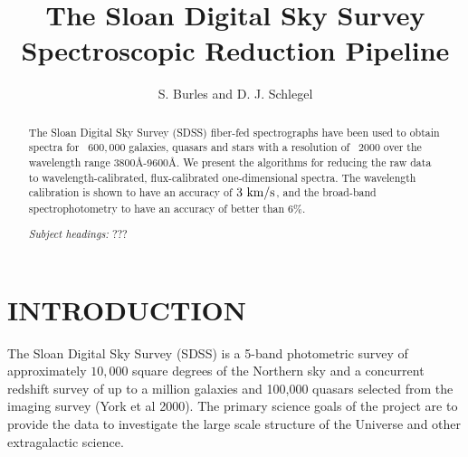 \documentclass[12pt,preprint]{aastex}
\newcommand{\kms}{{\rm ~km/s}}
\begin{document}
\title{The Sloan Digital Sky Survey Spectroscopic Reduction Pipeline}

\author{
S. Burles\altaffilmark{\ref{MIT}}
and D. J. Schlegel\altaffilmark{\ref{Princeton}}
}


\begin{abstract}
The Sloan Digital Sky Survey (SDSS) fiber-fed spectrographs have been used
to obtain spectra for ~$600,000$ galaxies, quasars and stars
with a resolution of ~2000 over the wavelength range 3800\AA -9600\AA.
We present the algorithms for reducing the raw data to
wavelength-calibrated, flux-calibrated one-dimensional spectra.
The wavelength calibration is shown to have an accuracy of $3 \kms$,
and the broad-band spectrophotometry to have an accuracy of better than $6\%$.

\emph{Subject headings: }
???
\end{abstract}

\section{INTRODUCTION}
\label{sec_intro}
The Sloan Digital Sky Survey (SDSS) is a 5-band photometric survey of
approximately $10,000$ square degrees of the Northern sky and a concurrent
redshift survey of up to a million galaxies and 100,000 quasars
selected from the imaging survey (York et al 2000).  The primary 
science goals of the project are to provide the data to investigate the
large scale structure of the Universe and other extragalactic science.
\end{document}
